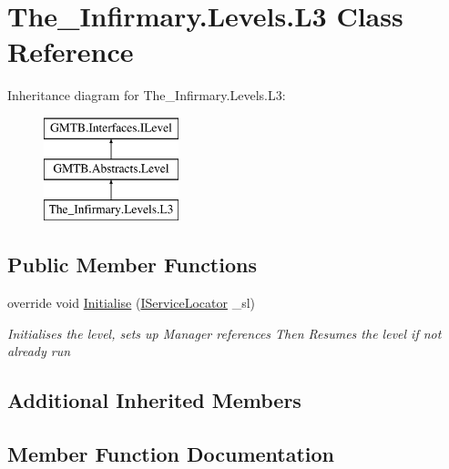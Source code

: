 \hypertarget{class_the___infirmary_1_1_levels_1_1_l3}{}\section{The\+\_\+\+Infirmary.\+Levels.\+L3 Class Reference}
\label{class_the___infirmary_1_1_levels_1_1_l3}
Inheritance diagram for The\+\_\+\+Infirmary.\+Levels.\+L3\+:\begin{figure}[H]
\begin{center}
\leavevmode
\includegraphics[height=3.000000cm]{class_the___infirmary_1_1_levels_1_1_l3}
\end{center}
\end{figure}
\subsection*{Public Member Functions}
\begin{DoxyCompactItemize}
\item 
override void \mbox{\hyperlink{class_the___infirmary_1_1_levels_1_1_l3_aa3f7e6218dcc9888160f80dfc48af443}{Initialise}} (\mbox{\hyperlink{interface_g_m_t_b_1_1_interfaces_1_1_i_service_locator}{I\+Service\+Locator}} \+\_\+sl)
\begin{DoxyCompactList}\small\item\em Initialises the level, sets up Manager references Then Resumes the level if not already run \end{DoxyCompactList}\end{DoxyCompactItemize}
\subsection*{Additional Inherited Members}


\subsection{Member Function Documentation}
\mbox{\label{class_the___infirmary_1_1_levels_1_1_l3_aa3f7e6218dcc9888160f80dfc48af443}} 
